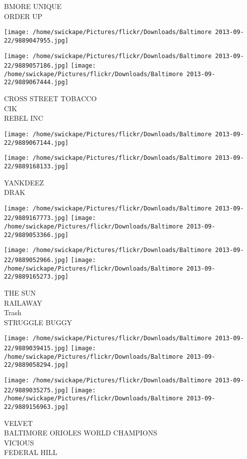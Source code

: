 \documentclass[10pt,letterpaper]{article}
\begin{document}
BMORE UNIQUE\\
ORDER UP
\pagebreak

\texttt{[image: /home/swickape/Pictures/flickr/Downloads/Baltimore 2013-09-22/9889047955.jpg]}

\vspace{0.25in}
\texttt{[image: /home/swickape/Pictures/flickr/Downloads/Baltimore 2013-09-22/9889057186.jpg]}
\texttt{[image: /home/swickape/Pictures/flickr/Downloads/Baltimore 2013-09-22/9889067444.jpg]}

CROSS STREET TOBACCO\\
CIK\\
REBEL INC
\pagebreak

\texttt{[image: /home/swickape/Pictures/flickr/Downloads/Baltimore 2013-09-22/9889067144.jpg]}

\vspace{0.25in}
\texttt{[image: /home/swickape/Pictures/flickr/Downloads/Baltimore 2013-09-22/9889168133.jpg]}

YANKDEEZ\\
DRAK
\pagebreak

\texttt{[image: /home/swickape/Pictures/flickr/Downloads/Baltimore 2013-09-22/9889167773.jpg]}
\texttt{[image: /home/swickape/Pictures/flickr/Downloads/Baltimore 2013-09-22/9889053366.jpg]}

\texttt{[image: /home/swickape/Pictures/flickr/Downloads/Baltimore 2013-09-22/9889052966.jpg]}
\texttt{[image: /home/swickape/Pictures/flickr/Downloads/Baltimore 2013-09-22/9889165273.jpg]}

THE SUN\\
RAILAWAY\\
Trash\\
STRUGGLE BUGGY
\pagebreak

\texttt{[image: /home/swickape/Pictures/flickr/Downloads/Baltimore 2013-09-22/9889039415.jpg]}
\texttt{[image: /home/swickape/Pictures/flickr/Downloads/Baltimore 2013-09-22/9889058294.jpg]}

\texttt{[image: /home/swickape/Pictures/flickr/Downloads/Baltimore 2013-09-22/9889035275.jpg]}
\texttt{[image: /home/swickape/Pictures/flickr/Downloads/Baltimore 2013-09-22/9889156963.jpg]}

VELVET\\
BALTIMORE ORIOLES WORLD CHAMPIONS\\
VICIOUS\\
FEDERAL HILL
\pagebreak
\end{document}
